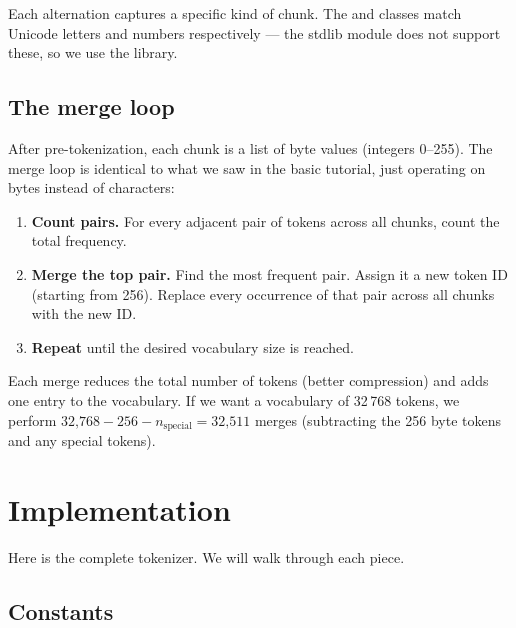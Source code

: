 Each alternation captures a specific kind of chunk.  The  and  classes match Unicode letters and numbers respectively --- the stdlib  module does not support these, so we use the  library.


\subsection{The merge loop}

After pre-tokenization, each chunk is a list of byte values (integers 0--255).  The merge loop is identical to what we saw in the basic tutorial, just operating on bytes instead of characters:

\begin{enumerate}
  \item \textbf{Count pairs.}  For every adjacent pair of tokens across all chunks, count the total frequency.
  \item \textbf{Merge the top pair.}  Find the most frequent pair.  Assign it a new token ID (starting from 256).  Replace every occurrence of that pair across all chunks with the new ID.
  \item \textbf{Repeat} until the desired vocabulary size is reached.
\end{enumerate}

Each merge reduces the total number of tokens (better compression) and adds one entry to the vocabulary.  If we want a vocabulary of 32\,768 tokens, we perform $32\text{,}768 - 256 - n_{\text{special}} = 32\text{,}511$ merges (subtracting the 256 byte tokens and any special tokens).


\section{Implementation}

Here is the complete tokenizer.  We will walk through each piece.

\subsection{Constants}

